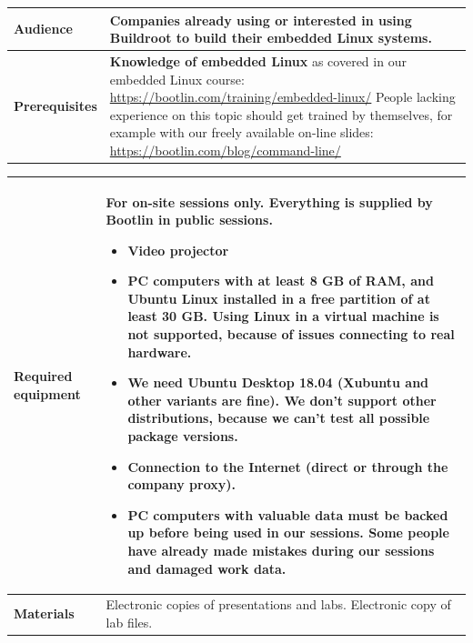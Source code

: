 \documentclass[a4paper,12pt,obeyspaces,spaces,hyphens]{article}
\begin{document}
{\begin{tabularx}{\textwidth}{|g|h|}
    {\bf Audience} & Companies already using or interested in using
    Buildroot to build their embedded Linux systems.\\
    \hline

    {\bf Prerequisites} & {\bf Knowledge of embedded Linux} as covered
    in our embedded Linux course:
    \newline \url{https://bootlin.com/training/embedded-linux/} \vspace{1em}
    \newline People lacking experience on this topic should get
    trained by themselves, for example with our freely available
    on-line slides:
    \newline \url{https://bootlin.com/blog/command-line/} \\
    \hline
  \end{tabularx}

  \begin{tabularx}{\textwidth}{|g|h|}
    {\bf Required equipment} &
    {\bf For on-site sessions only.}
    \newline Everything is supplied by Bootlin in public
    sessions.
    \begin{itemize}
    \item Video projector
    \item PC computers with at least 8 GB of RAM, and Ubuntu Linux
    installed in a {\bf free partition of at least 30 GB. Using Linux
      in a virtual machine is not supported}, because of issues
    connecting to real hardware.
    \item We need Ubuntu Desktop 18.04 (Xubuntu and other
    variants are fine). We don't support other
    distributions, because we can't test all possible package versions.
    \item {\bf Connection to the Internet} (direct or through the
    company proxy).
    \item {\bf PC computers with valuable data must be backed up}
    before being used in our sessions.  Some people have already made
    mistakes during our sessions and damaged work data.
    \end{itemize}\\
    \hline

    {\bf Materials} & Electronic copies of presentations and
    labs.
    \newline Electronic copy of lab files.\\
    \hline

\end{tabularx}}
\end{document}
